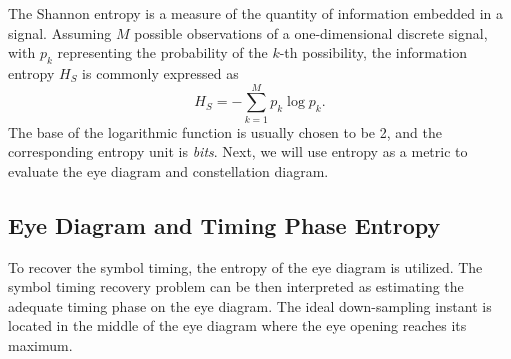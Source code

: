 \documentclass[journal,comsoc]{IEEEtran}
\begin{document}
The Shannon entropy is a measure of the quantity of information  embedded in a signal.
Assuming \(M\) possible observations of a one-dimensional discrete signal, with \(p_k\) representing the probability of the \(k\)-th possibility, the information entropy \(H_S\) is commonly expressed as \cite{Shannon1948}
\begin{equation}
H_S =  - \sum\limits_{k = 1}^M {{p_k}\log {p_k}}.
\label{eq:entropy}
\end{equation}
The base of the logarithmic function is usually chosen to be 2, and the corresponding entropy unit is \textit{bits}.
Next, we will use entropy as a metric to evaluate the eye diagram and constellation diagram.

\subsection{Eye Diagram and Timing Phase Entropy}
\label{sec:eye_entp}
To recover the symbol timing, the entropy of the eye diagram is utilized. 
The symbol timing recovery problem can be then interpreted as estimating the adequate timing phase on the eye diagram.
The ideal down-sampling instant is located in the middle of the eye diagram where the eye opening reaches its maximum.
\end{document}
